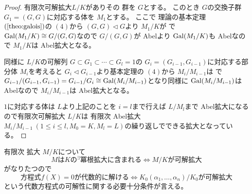 \documentclass[../master_galois_theory]{subfiles}
\begin{document}
\begin{proof}
  有限次可解拡大$L/K$がありその \galois 群を $G$とする。
  このとき $G$の交換子群 $G_1 = (G,G)$に対応する体を $M_1$とする。
  ここで \galois 理論の基本定理 $(\mathrm{\ref{theo:galois}})$の $(4)$から
  $(G,G) \lhd G$より $M_1/K$が \galois で $\mathrm{Gal}(M_1/K) \cong G/(G,G)$なので
  $G/(G,G)$が \rm{Abel}より $\mathrm{Gal}(M_1/K)$も \rm{Abel}なので $M_1/K$は \rm{Abel}拡大となる。

  同様に $L/K$の可解列 $G \subset G_1 \subset \cdots \subset G_l = 1$の
  $G_i = (G_{i-1},G_{i-1})$に対応する部分体 $M_i$を考えると $G_i \lhd G_{i-1}$より基本定理の $(4)$から
  $M_i/M_{i-1}$は \galois で
  $G_{i-1}/(G_{i-1},G_{i-1}) = G_{i-1}/G_i \cong \mathrm{Gal}(M_i/M_{i-1})$となり同様に $\mathrm{Gal}(M_i/M_{i-1})$は \rm{Abel}なので $M_i/M_{i-1}$は \rm{Abel}拡大となる。

  $1$に対応する体は $L$より上記のことを $i = l$まで行えば $L/M_l$まで \rm{Abel}拡大になるので有限次可解拡大 $L/K$は 有限次 \rm{Abel}拡大 $M_i/M_{i-1} \  (1 \leq i \leq l , M_0 = K , M_l = L)$の繰り返しでできる拡大となっている。
\end{proof}

\begin{theo} \label{theo:kakai}
  有限次 \galois 拡大 $M/K$について
  \[
  MはKの {}^\exists 冪根拡大に含まれる \Leftrightarrow M/Kが可解拡大
  \]
  がなりたつので
  \[
  方程式 f(X) = 0が代数的に解ける \Leftrightarrow K_0(\alpha_1 , \dots , \alpha_n) / K_0が可解拡大
  \]
  という代数方程式の可解性に関する必要十分条件が言える。
\end{theo}

\clearpage
\end{document}
